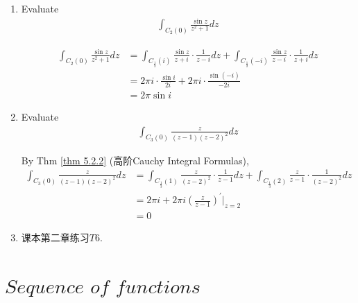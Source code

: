 \begin{enumerate}
	\vspace{2em}
	
	\item Evaluate
	\begin{align}
		\int_{C_{2}(0)}{\frac{\sin{z}}{z^2 + 1} dz}
	\end{align}
	
	\vspace{2em}
	\begin{solution}
		\begin{align}
			\int_{C_{2}(0)}{\frac{\sin{z}}{z^2 + 1} dz} 
			&= \int_{C_{\frac{1}{2}}(i)}{\frac{\sin{z}}{z + i} \cdot \frac{1}{z - i} dz} + \int_{C_{\frac{1}{2}}(-i)}{\frac{\sin{z}}{z - i} \cdot \frac{1}{z + i} dz} \\
			&= 2 \pi i \cdot \frac{\sin{i}}{2i} + 2 \pi i \cdot \frac{\sin{(-i)}}{-2i} \\
			&= 2\pi \sin{i}
		\end{align}
	\end{solution}
	
	\vspace{2em}
	
	\item Evaluate
	\begin{align}
		\int_{C_{3}(0)}{\frac{z}{(z - 1)(z - 2)^2} dz}
	\end{align}
	
	\vspace{2em}
	\begin{solution}
		By Thm \ref{thm 5.2.2} (高阶Cauchy Integral Formulas),
		\begin{align}
			\int_{C_{3}(0)}{\frac{z}{(z - 1)(z - 2)^2} dz} 
			&= \int_{C_{\frac{1}{3}}(1)}{\frac{z}{(z - 2)^2} \cdot \frac{1}{z - 1} dz} + \int_{C_{\frac{1}{3}}(2)}{\frac{z}{z - 1} \cdot \frac{1}{(z - 2)^2} dz} \\
			&= 2 \pi i + 2 \pi i \left( \frac{z}{z - 1} \right)^{'}\Big|_{z = 2} \\
			&= 0
		\end{align}
	\end{solution}
	
	\vspace{1em}
	
	\item 课本第二章练习$T6$.
\end{enumerate}

\newpage

\section{$Sequence \,\, of \,\, functions$}
